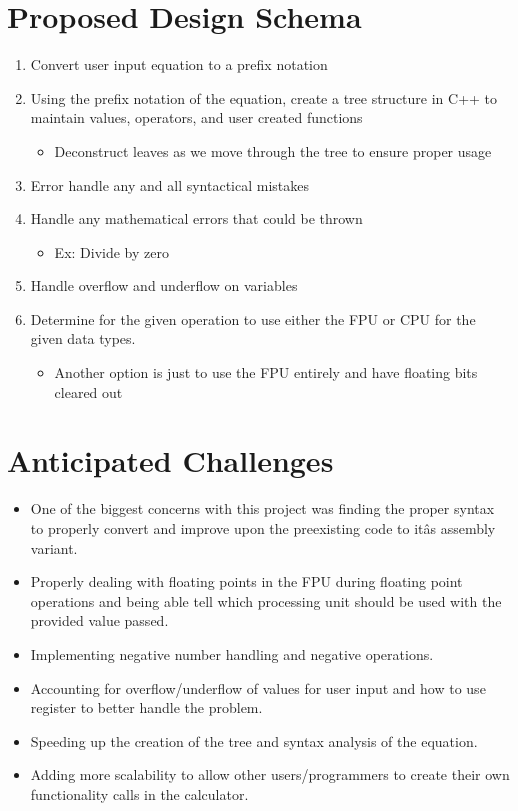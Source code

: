 \documentclass[a4paper,10pt]{article}
\begin{document}
\section*{Proposed Design Schema}
\begin{enumerate}
  \item Convert user input equation to a prefix notation 
  \item Using the prefix notation of the equation, create a tree structure in C++ to maintain values, operators, and user created functions
  \begin{itemize}
      \item Deconstruct leaves as we move through the tree to ensure proper usage
  \end{itemize}
  \item Error handle any and all syntactical mistakes
  \item Handle any mathematical errors that could be thrown
  \begin{itemize}
      \item Ex: Divide by zero
  \end{itemize}
  \item Handle overflow and underflow on variables
  \item Determine for the given operation to use either the FPU or CPU for the given data types. 
  \begin{itemize}
      \item Another option is just to use the FPU entirely and have floating bits cleared out 
  \end{itemize}
\end{enumerate}




\section*{Anticipated Challenges}

\begin{itemize}
  \item One of the biggest concerns with this project was finding the proper syntax to properly convert and improve upon the preexisting code to itâs assembly variant. 
  \item Properly dealing with floating points in the FPU during floating point operations and being able tell which processing unit should be used with the provided value passed.
  \item Implementing negative number handling and negative operations.
  \item Accounting for overflow/underflow of values for user input and how to use register to better handle the problem. 
  \item Speeding up the creation of the tree and syntax analysis of the equation.
  \item Adding more scalability to allow other users/programmers to create their own functionality calls in the calculator.
\end{itemize}
\end{document}
